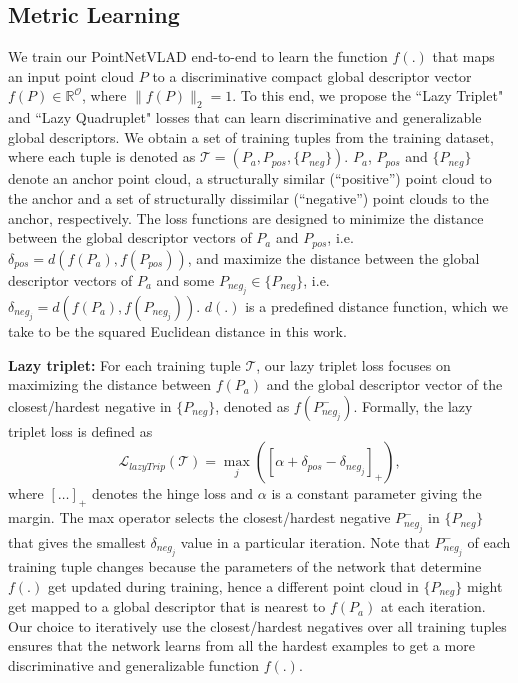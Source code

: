 \documentclass[10pt,twocolumn,letterpaper]{article}
\begin{document}
\subsection{Metric Learning}

We train our PointNetVLAD end-to-end to learn the function $f(.)$
that maps an input point cloud $P$ to a discriminative compact global descriptor vector $f(P)\in\mathbb{R}^{\mathcal{O}}$, where $\|f(P)\|_{2}=1$. To this end, we 
propose the ``Lazy Triplet" and ``Lazy Quadruplet" losses that can learn discriminative and generalizable global descriptors. We obtain a set of training tuples from the training dataset, where each tuple is denoted as $\mathcal{T} = (P_a,P_{pos},\{P_{neg}\})$. $P_a$, $P_{pos}$ and $\{P_{neg}\}$ denote an anchor point cloud, a structurally similar (``positive'') point cloud to the anchor and a set of structurally dissimilar (``negative'') point clouds to the anchor, respectively. 
The loss functions are designed to 
minimize the distance between the global descriptor vectors of $P_a$ and $P_{pos}$, i.e. $\delta_{pos}=d(f(P_a),f(P_{pos}))$, and maximize the distance between the global descriptor vectors of $P_a$ and some $P_{neg_{j}}\in \{P_{neg}\}$, i.e. $\delta_{neg_{j}}=d(f(P_a),f(P_{neg_{j}}))$. $d(.)$ is a predefined distance function, which we take to be the squared Euclidean distance in this work.
\newline



\noindent \textbf{Lazy triplet:} 
For each training tuple $\mathcal{T}$, our lazy triplet loss focuses on maximizing the distance between $f(P_a)$ and the global descriptor vector of the
closest/hardest negative in $\{P_{neg}\}$, denoted as $f(P_{neg_j}^{-})$. Formally, the lazy triplet loss is defined as
\begin{equation}
\mathcal{L}_{lazyTrip}(\mathcal{T})=\max_{j}([\alpha+\delta_{pos}-\delta_{neg_{j}}]_{+}),
\label{eq:lazyTriplet}
\end{equation}
where $[\ldots]_{+}$ denotes the hinge loss and $\alpha$ is a constant parameter giving the margin.   
The max operator selects the closest/hardest negative $P_{neg_j}^{-}$ in $\{P_{neg}\}$ that gives the smallest $\delta_{neg_j}$ value in a particular iteration. Note that $P_{neg_j}^{-}$ of each training tuple changes because the parameters of the network that determine $f(.)$ get updated during training, hence a different point cloud in $\{P_{neg}\}$ might get mapped to a global descriptor that is nearest to $f(P_a)$ at each iteration. Our choice to iteratively 
use the closest/hardest negatives over all training tuples ensures that the network learns from all the hardest examples to get a more discriminative and generalizable function $f(.)$.
\newline
 
\end{document}
